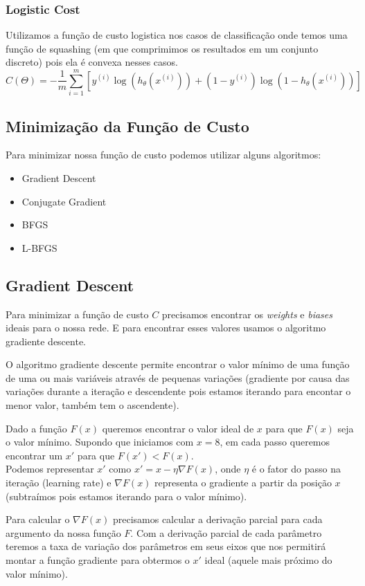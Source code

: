 \documentclass[11pt,a4paper,leqno]{article}
\begin{document}
\subsubsection{Logistic Cost}
Utilizamos a função de custo logistica nos casos de classificação onde temos uma função de squashing (em que comprimimos os resultados em um conjunto discreto) pois ela é convexa nesses casos.
\[
C(\Theta) = - \frac{1}{m} \displaystyle \sum_{i=1}^m [y^{(i)} \log(h_\theta(x^{(i)})) + (1 - y^{(i)}) \log(1 - h_\theta(x^{(i)}))]
\]

\subsection{Minimização da Função de Custo}
Para minimizar nossa função de custo podemos utilizar alguns algoritmos:
\begin{itemize}
\item Gradient Descent
\item Conjugate Gradient
\item BFGS
\item L-BFGS
\end{itemize}

\subsection{Gradient Descent}

Para minimizar a função de custo $C$ precisamos encontrar os \emph{weights} e \emph{biases} ideais para o nossa rede. E para encontrar esses valores usamos o algoritmo gradiente descente.

O algoritmo gradiente descente permite encontrar o valor mínimo de uma função de uma ou mais variáveis através de pequenas variações (gradiente por causa das variações durante a iteração e descendente pois estamos iterando para encontar o menor valor, também tem o ascendente).

Dado a função $F(x)$ queremos encontrar o valor ideal de $x$ para que $F(x)$ seja o valor mínimo.
Supondo que iniciamos com $x=8$, em cada passo queremos encontrar um $x'$ para que $F(x') < F(x)$.\\
Podemos representar $x'$ como $x' = x - \eta \nabla F(x)$, onde $\eta$ é o fator do passo na iteração (learning rate) e $\nabla F(x)$ representa o gradiente a partir da posição $x$ (subtraímos pois estamos iterando para o valor mínimo).

Para calcular o $\nabla F(x)$ precisamos calcular a derivação parcial	para cada argumento da nossa função $F$. Com a derivação parcial de cada parâmetro teremos a taxa de variação dos parâmetros em seus eixos que nos permitirá montar a função gradiente para obtermos o $x'$ ideal (aquele mais próximo do valor mínimo).
\end{document}
